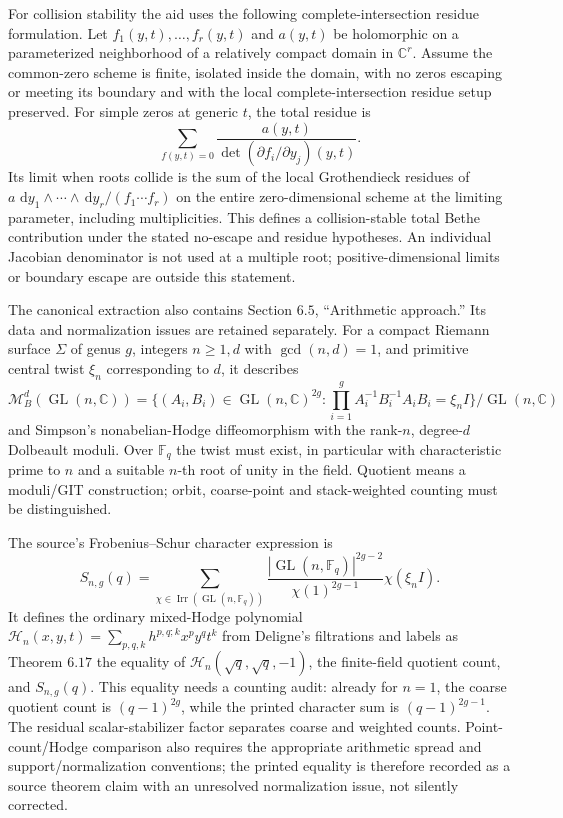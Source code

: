 \documentclass[11pt]{article}
\newcommand{\C}{\mathbb{C}}
\newcommand{\F}{\mathbb{F}}
\newcommand{\dd}{\,\mathrm{d}}
\begin{document}
For collision stability the aid uses the following complete-intersection residue formulation. Let \(f_1(y,t),\ldots,f_r(y,t)\) and \(a(y,t)\) be holomorphic on a parameterized neighborhood of a relatively compact domain in \(\C^r\). Assume the common-zero scheme is finite, isolated inside the domain, with no zeros escaping or meeting its boundary and with the local complete-intersection residue setup preserved. For simple zeros at generic \(t\), the total residue is
\[
 \sum_{f(y,t)=0}\frac{a(y,t)}{\det(\partial f_i/\partial y_j)(y,t)}.
\]
Its limit when roots collide is the sum of the local Grothendieck residues of
\(a\,\dd y_1\wedge\cdots\wedge\dd y_r/(f_1\cdots f_r)\)
on the entire zero-dimensional scheme at the limiting parameter, including multiplicities. This defines a collision-stable total Bethe contribution under the stated no-escape and residue hypotheses. An individual Jacobian denominator is not used at a multiple root; positive-dimensional limits or boundary escape are outside this statement.

The canonical extraction also contains Section \(6.5\), ``Arithmetic approach.'' Its data and normalization issues are retained separately. For a compact Riemann surface \(\Sigma\) of genus \(g\), integers \(n\geq1,d\) with \(\gcd(n,d)=1\), and primitive central twist \(\xi_n\) corresponding to \(d\), it describes
\[
 \mathcal M_B^d(\operatorname{GL}(n,\C))=
 \{(A_i,B_i)\in\operatorname{GL}(n,\C)^{2g}:
       \prod_{i=1}^g A_i^{-1}B_i^{-1}A_iB_i=\xi_n I\}/\operatorname{GL}(n,\C)
\]
and Simpson's nonabelian-Hodge diffeomorphism with the rank-\(n\), degree-\(d\) Dolbeault moduli. Over \(\F_q\) the twist must exist, in particular with characteristic prime to \(n\) and a suitable \(n\)-th root of unity in the field. Quotient means a moduli/GIT construction; orbit, coarse-point and stack-weighted counting must be distinguished.

The source's Frobenius--Schur character expression is
\[
 S_{n,g}(q)=\sum_{\chi\in\operatorname{Irr}(\operatorname{GL}(n,\F_q))}
       \frac{|\operatorname{GL}(n,\F_q)|^{2g-2}}{\chi(1)^{2g-1}}
       \chi(\xi_n I).
\]
It defines the ordinary mixed-Hodge polynomial
\(\mathcal H_n(x,y,t)=\sum_{p,q,k}h^{p,q;k}x^py^qt^k\)
from Deligne's filtrations and labels as Theorem \(6.17\) the equality of \(\mathcal H_n(\sqrt q,\sqrt q,-1)\), the finite-field quotient count, and \(S_{n,g}(q)\). This equality needs a counting audit: already for \(n=1\), the coarse quotient count is \((q-1)^{2g}\), while the printed character sum is \((q-1)^{2g-1}\). The residual scalar-stabilizer factor separates coarse and weighted counts. Point-count/Hodge comparison also requires the appropriate arithmetic spread and support/normalization conventions; the printed equality is therefore recorded as a source theorem claim with an unresolved normalization issue, not silently corrected.
\end{document}
